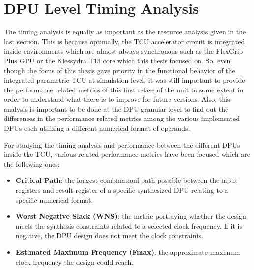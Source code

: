 \section{DPU Level Timing Analysis}


The timing analysis is equally as important as the resource analysis given in the last section. This is because optimally, the TCU accelerator circuit is integrated inside environments which are almost always synchronous such as the FlexGrip Plus GPU or the Klessydra T13 core which this thesis focused on. So, even though the focus of this thesis gave priority in the functional behavior of the integrated parametric TCU at simulation level, it was still important to provide the performance related metrics of this first relase of the unit to some extent in order to understand what there is to improve for future versions. Also, this analysis is important to be done at the DPU granular level to find out the differences in the performance related metrics among the various implemented DPUs each utilizing a different numerical format of operands. 


For studying the timing analysis and performance between the different DPUs inside the TCU, various related performance metrics have been focused which are the following ones: 

\begin{itemize}

    \item \textbf{Critical Path}: the longest combinationl path possible between the input registers and result register of a specific synthesized DPU relating to a specific numerical format.
    
    \item \textbf{Worst Negative Slack (WNS)}:  the metric portraying whether the design meets the synthesis constraints related to a selected clock frequency. If it is negative, the DPU design does not meet the clock constraints.
    
    \item \textbf{Estimated Maximum Frequency (Fmax)}: the approximate maximum clock frequency the design could reach.

\end{itemize}

